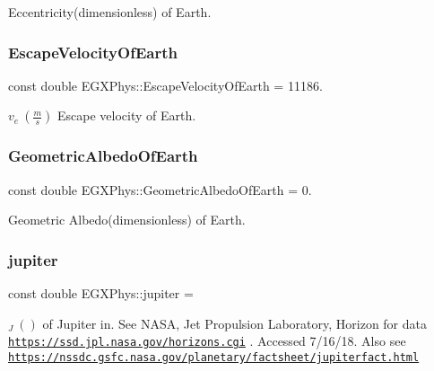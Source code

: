 Eccentricity(dimensionless) of Earth. \mbox{\label{namespace_e_g_x_phys_a6a8cb7abae15a2f1bbcfd6623f72316c}} 
\subsubsection{\texorpdfstring{Escape\+Velocity\+Of\+Earth}{EscapeVelocityOfEarth}}
{\footnotesize\ttfamily const double E\+G\+X\+Phys\+::\+Escape\+Velocity\+Of\+Earth = 11186.}

$v_e\ (\frac{m}{s})$ Escape velocity of Earth. \mbox{\label{namespace_e_g_x_phys_aae01fb8ed365fc5de7acebeef34b7351}} 
\subsubsection{\texorpdfstring{Geometric\+Albedo\+Of\+Earth}{GeometricAlbedoOfEarth}}
{\footnotesize\ttfamily const double E\+G\+X\+Phys\+::\+Geometric\+Albedo\+Of\+Earth = 0.}

Geometric Albedo(dimensionless) of Earth. \mbox{\label{namespace_e_g_x_phys_a82f61dffeb74af80a52a3bf5ed43eed0}} 
\subsubsection{\texorpdfstring{jupiter}{jupiter}}
{\footnotesize\ttfamily const double E\+G\+X\+Phys\+::jupiter =}

$ _{J} \ ( )$ of Jupiter in. See N\+A\+SA, Jet Propulsion Laboratory, Horizon for data \href{https://ssd.jpl.nasa.gov/horizons.cgi}{\tt https\+://ssd.\+jpl.\+nasa.\+gov/horizons.\+cgi} . Accessed 7/16/18. Also see \href{https://nssdc.gsfc.nasa.gov/planetary/factsheet/jupiterfact.html}{\tt https\+://nssdc.\+gsfc.\+nasa.\+gov/planetary/factsheet/jupiterfact.\+html} \mbox{\label{namespace_e_g_x_phys_a75f9f5d512c3c8c64755daa1cfb433c7}} 
